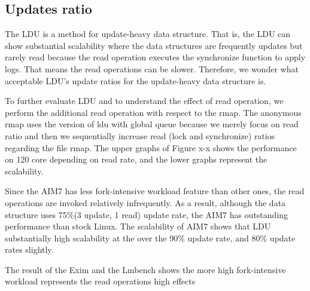 \subsection{Updates ratio}

The LDU is a method for update-heavy data structure.
That is, the LDU can show substantial scalability where the data structures are
frequently updates but rarely read because the read operation executes the
synchronize function to apply logs.
That means the read operations can be slower.
Therefore, we wonder what acceptable LDU's update ratios for the update-heavy
data structure is.

To further evaluate LDU and to understand the effect of read operation, we
perform the additional read operation with respect to the rmap.
The anonymous rmap uses the version of ldu with global queue because we
merely focus on read ratio and then we sequentially increase read (lock and
synchronize) ratios regarding the file rmap.
The upper graphs of Figure x-x  shows the performance on 120 core depending
on read rate, and the lower graphs represent the scalability.

Since the AIM7 has less fork-intensive workload feature than other ones, the
read operations are invoked relatively infrequently.
As a result, although the data structure uses 75\%(3
update, 1 read) update rate, the AIM7 has outstanding performance than stock
Linux.
The scalability of AIM7 shows that LDU substantially high scalability at the
over the 90\% update rate, and 80\% update rates slightly. 

The result of the Exim and the Lmbench shows the more high fork-intensive
workload represents the read operations high effects

